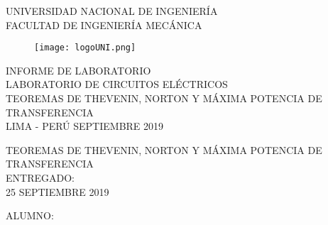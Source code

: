 \documentclass[a4paper,12pt]{report}
\begin{document}
\setcounter{page}{1}
\thispagestyle{empty}
\begin{center}
{\huge UNIVERSIDAD NACIONAL DE INGENIERÍA}\\[0.9cm]
{\Large FACULTAD DE INGENIERÍA MECÁNICA}\\[0.6in]
\end{center}
\begin{figure}[h]
\begin{center}
\texttt{[image: logoUNI.png]}
\vspace{0cm}
\end{center}
\end{figure}
\vspace{0.5cm}
\begin{center}
INFORME DE LABORATORIO\\
LABORATORIO DE CIRCUITOS ELÉCTRICOS\\[5mm]
{\large TEOREMAS DE THEVENIN, NORTON Y MÁXIMA POTENCIA DE TRANSFERENCIA}\\[10mm]
\vfill
LIMA - PERÚ \hfill SEPTIEMBRE 2019
\end{center}
\newpage
\thispagestyle{empty}
\begin{center}
{\Huge TEOREMAS DE THEVENIN, NORTON Y MÁXIMA POTENCIA DE TRANSFERENCIA}\\[0.7cm]
\small ENTREGADO:\\[0.05cm]
\small 25 SEPTIEMBRE 2019\\[1.2cm]
\end{center}
\begin{flushleft}
{\large ALUMNO:}\\[2cm]
\end{flushleft}
\end{document}
